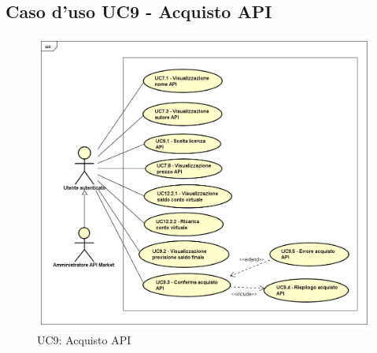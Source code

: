 \newpage
\subsection{Caso d'uso UC9 - Acquisto API}
\label{UC9}
\begin{figure}[ht]
	\centering
	\includegraphics[scale=0.45]{UML/UC9.png}
	\caption{UC9: Acquisto API}
\end{figure}

